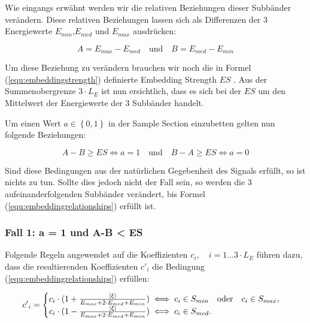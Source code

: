 Wie eingangs erwähnt werden wir die relativen Beziehungen dieser Subbänder verändern. Diese relativen Beziehungen lassen sich als Differenzen der 3 Energiewerte ${E}_{min}$,${E}_{med}$ und ${E}_{max}$ ausdrücken:

	 \begin{equation}
		 A = {E}_{max}-{E}_{med} \quad\mbox{und}\quad B = {E}_{med}-{E}_{min} \label{equ:energydifferences}
	 \end{equation}

Um diese Beziehung zu verändern brauchen wir noch die in Formel (\ref{equ:embeddingstrength}) definierte Embedding Strength $ES$ . Aus der Summenobergrenze $3 \cdot {L}_{E}$ ist nun ersichtlich, dass es sich bei der $ES$ um den Mittelwert der Energiewerte der 3 Subbänder handelt.

Um einen Wert $a \in\left\{0,1\right\}$ in der Sample Section einzubetten gelten nun folgende Beziehungen:

	 \begin{equation}
		 A - B \geq ES \iff a = 1 \quad\mbox{und}\quad B - A \geq ES \iff a = 0 \label{equ:embeddingrelationships}
	 \end{equation}
	 
Sind diese Bedingungen aus der natürlichen Gegebenheit des Signals erfüllt, so ist nichts zu tun. Sollte dies jedoch nicht der Fall sein, so werden die 3 aufeinanderfolgenden Subbänder verändert, bis Formel (\ref{equ:embeddingrelationships}) erfüllt ist. 

\subsubsection{Fall 1: a = 1 und A-B < ES} 

Folgende Regeln angewendet auf die Koeffizienten ${c}_{i},\quad i=1\dots{3\cdot{L}_{E}}$ führen dazu, dass die resultierenden Koeffizienten ${c'}_{i}$ die Bedingung (\ref{equ:embeddingrelationships}) erfüllen:

	 \begin{equation}
		 {c'}_{i} = \begin{cases}
    	 				{c}_{i} \cdot ( 1 + { |\xi| \over {{E}_{max} + 2\cdot {E}_{med} + {E}_{min}} }) \iff {c}_{i} \in {S}_{min} \quad\mbox{oder}\quad {c}_{i} \in {S}_{max}, 
						\\
    					{c}_{i} \cdot ( 1 - { |\xi| \over {{E}_{max} + 2\cdot {E}_{med} + {E}_{min}} }) \iff {c}_{i} \in {S}_{med}.
  				  	\end{cases}
		  \label{equ:modifcoef_case1}
	 \end{equation}
	 
